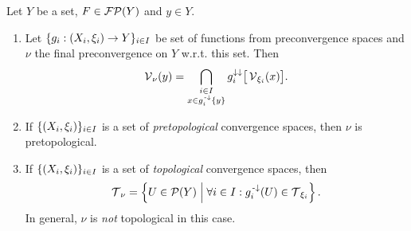 \begin{proposition} \label{pretopologicalFinalConvergence}
Let $Y$ be a set, $F\in \operatorname{\mathcal{FP}}(Y)$ and $y\in Y$.
\begin{enumerate}
\item Let $\{g_i: \left( X_i, \xi_i \right) \to Y\}_{i\in I}$ be set of functions from preconvergence spaces and $\nu$ the final preconvergence on $Y$ w.r.t. this set. Then 
\[ \operatorname{\mathcal{V}}_\nu(y) = \bigcap_{\substack{i\in I \\ x\in g^{\text{\hspace{0.15em}-}\downarrow}_i\{y\}}}g_i^{\downarrow\downarrow}\big[\operatorname{\mathcal{V}}_{\xi_i}(x)\big]. \]
\item If $\{\left( X_i, \xi_i \right)\}_{i\in I}$ is a set of \emph{pretopological} convergence spaces, then $\nu$ is pretopological.
\item If $\{\left( X_i, \xi_i \right)\}_{i\in I}$ is a set of \emph{topological} convergence spaces, then
\[ \operatorname{\mathcal{T}}_\nu = \left\{ U\in\operatorname{\mathcal{P}}(Y) \;\middle|\; \forall i\in I: g_i^{{\text{\hspace{0.15em}-}\downarrow}}(U)\in\operatorname{\mathcal{T}}_{\xi_i} \right\}. \]
In general, $\nu$ is \emph{not} topological in this case.
\end{enumerate}
\end{proposition}
